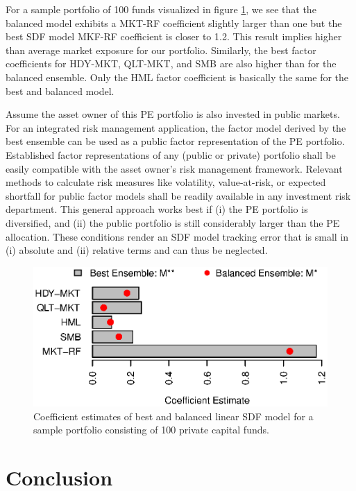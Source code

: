 \documentclass[12pt]{article}
\begin{document}
For a sample portfolio of 100 funds visualized in figure \ref{fig:coef_barchart_100_pofo}, we see that the balanced model exhibits a MKT-RF coefficient slightly larger than one but the best SDF model MKF-RF coefficient is closer to 1.2.
This result implies higher than average market exposure for our portfolio.
Similarly, the best factor coefficients for HDY-MKT, QLT-MKT, and SMB are also higher than for the balanced ensemble.
Only the HML factor coefficient is basically the same for the best and balanced model.

Assume the asset owner of this PE portfolio is also invested in public markets.
For an integrated risk management application, the factor model derived by the best ensemble can be used as a public factor representation of the PE portfolio.
Established factor representations of any (public or private) portfolio shall be easily compatible with the asset owner's risk management framework.
Relevant methods to calculate risk measures like volatility, value-at-risk, or expected shortfall for public factor models shall be readily available in any investment risk department. 
This general approach works best if (i) the PE portfolio is diversified, and (ii) the public portfolio is still considerably larger than the PE allocation.
These conditions render an SDF model tracking error that is small in (i) absolute and (ii) relative terms and can thus be neglected.

\begin{figure}[H]
	\centering
	\includegraphics{Figures/Coefs100Pofo}
	\caption{Coefficient estimates of best and balanced linear SDF model for a sample portfolio consisting of 100 private capital funds.}
	\label{fig:coef_barchart_100_pofo}
\end{figure}

\fi

\section{Conclusion}
\label{sec:conclusion}
\end{document}
